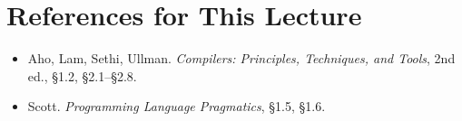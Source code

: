 \documentclass[11pt]{article}
\begin{document}
\section*{References for This Lecture}
\begin{itemize}
  \item [DB] Aho, Lam, Sethi, Ullman. \textit{Compilers: Principles, Techniques, and Tools}, 2nd ed., \S1.2, \S2.1--\S2.8.
  \item [PP] Scott. \textit{Programming Language Pragmatics}, \S1.5, \S1.6.
\end{itemize}
\end{document}
